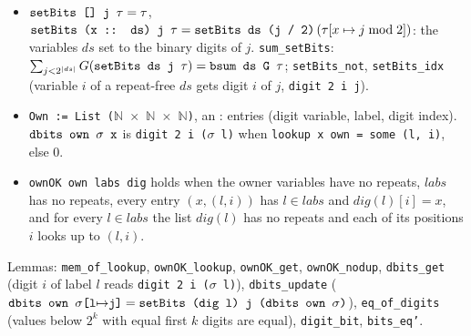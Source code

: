 \begin{definition}\label{def:lean-pathsum-digit-assign}
\begin{itemize}
\item $\textnormal{\texttt{setBits [] j \ensuremath{\tau}}} = \tau$,
  $\textnormal{\texttt{setBits (\allowbreak{}x :: ds) j \ensuremath{\tau}}} = \textnormal{\texttt{setBits ds (\allowbreak{}j / 2)}}\,(\tau[x\mapsto j\bmod2])$: the
  variables $ds$ set to the binary digits of $j$. \textnormal{\texttt{sum\_\allowbreak{}setBits}}:
  $\sum_{j<2^{|ds|}}G(\textnormal{\texttt{setBits ds j \ensuremath{\tau}}}) = \textnormal{\texttt{bsum ds G \ensuremath{\tau}}}$; \textnormal{\texttt{setBits\_\allowbreak{}not}},
  \textnormal{\texttt{setBits\_\allowbreak{}idx}} (variable $i$ of a repeat-free $ds$ gets digit $i$ of $j$, \textnormal{\texttt{digit 2 i j}}).
\item \textnormal{\texttt{Own := List (\allowbreak{}\ensuremath{\mathbb{N}} \ensuremath{\times} \ensuremath{\mathbb{N}} \ensuremath{\times} \ensuremath{\mathbb{N}})}}, an : entries (digit variable, label, digit
  index). $\textnormal{\texttt{dbits own \ensuremath{\sigma} x}}$ is \textnormal{\texttt{digit 2 i (\allowbreak{}\ensuremath{\sigma} l)}} when \textnormal{\texttt{lookup x own = some (\allowbreak{}l,\allowbreak{} i)}},
  else $0$.
\item \textnormal{\texttt{ownOK own labs dig}} holds when the owner variables have no repeats, $labs$ has no
  repeats, every entry $(x,(l,i))$ has $l\in labs$ and $\mathit{dig}(l)[i] = x$, and for every
  $l\in labs$ the list $\mathit{dig}(l)$ has no repeats and each of its positions $i$ looks up to
  $(l,i)$.
\end{itemize}
\end{definition}

\noindent Lemmas: \textnormal{\texttt{mem\_\allowbreak{}of\_\allowbreak{}lookup}}, \textnormal{\texttt{ownOK\_\allowbreak{}lookup}}, \textnormal{\texttt{ownOK\_\allowbreak{}get}},
\textnormal{\texttt{ownOK\_\allowbreak{}nodup}}, \textnormal{\texttt{dbits\_\allowbreak{}get}} (digit $i$ of label $l$ reads \textnormal{\texttt{digit 2 i (\allowbreak{}\ensuremath{\sigma} l)}}),
\textnormal{\texttt{dbits\_\allowbreak{}update}} ($\textnormal{\texttt{dbits own \ensuremath{\sigma}[l\ensuremath{\mapsto}j]}} = \textnormal{\texttt{setBits (\allowbreak{}dig l) j (\allowbreak{}dbits own \ensuremath{\sigma})}}$),
\textnormal{\texttt{eq\_\allowbreak{}of\_\allowbreak{}digits}} (values below $2^k$ with equal first $k$ digits are equal),
\textnormal{\texttt{digit\_\allowbreak{}bit}}, \textnormal{\texttt{bits\_\allowbreak{}eq'}}.

